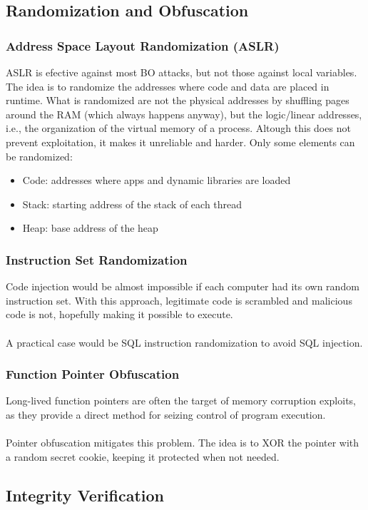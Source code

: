 \documentclass[10pt,a4paper]{report}
\begin{document}
\subsection{Randomization and Obfuscation}
\subsubsection{Address Space Layout Randomization (ASLR)}
ASLR is efective against most BO attacks, but not those against local variables. The idea is to randomize the addresses where code and data are placed in runtime. What is randomized are not the physical addresses by shuffling pages around the RAM (which always happens anyway), but the logic/linear addresses, i.e., the organization of the virtual memory of a process.
Altough this does not prevent exploitation, it makes it unreliable and harder. Only some elements can be randomized:
\begin{itemize}
\item Code: addresses where apps and dynamic libraries are loaded
\item Stack: starting address of the stack of each thread
\item Heap: base address of the heap
\end{itemize}
\subsubsection{Instruction Set Randomization}
Code injection would be almost impossible if each computer had its own random instruction set. With this approach, legitimate code is scrambled and malicious code is not, hopefully making it possible to execute.\\
\\
A practical case would be SQL  instruction randomization to avoid SQL injection.
\subsubsection{Function Pointer Obfuscation}
Long-lived function pointers are often the target of memory corruption exploits, as they provide a direct method for seizing control of program execution.\\
\\
Pointer obfuscation mitigates this problem. The idea is to XOR the pointer with a random secret cookie, keeping it protected when not needed.
\subsection{Integrity Verification}
\end{document}
